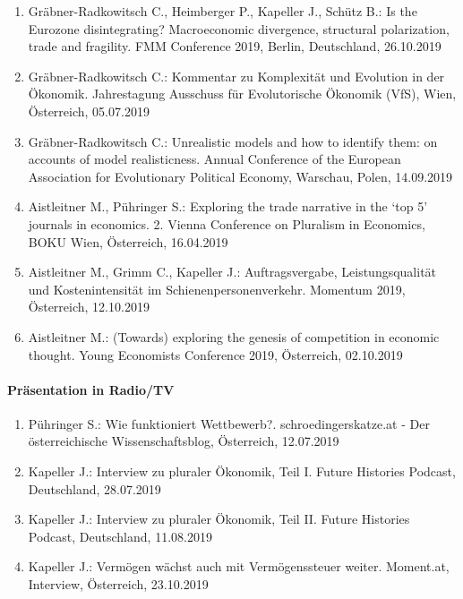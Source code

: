 \begin{enumerate}
	\item Gräbner-Radkowitsch C., Heimberger P., Kapeller J., Schütz B.: Is the Eurozone disintegrating? Macroeconomic divergence, structural polarization, trade and fragility. FMM Conference 2019, Berlin, Deutschland, 26.10.2019
	\item Gräbner-Radkowitsch C.: Kommentar zu Komplexität und Evolution in der Ökonomik. Jahrestagung Ausschuss für Evolutorische Ökonomik (VfS), Wien, Österreich, 05.07.2019
	\item Gräbner-Radkowitsch C.: Unrealistic models and how to identify them: on accounts of model realisticness. Annual Conference of the European Association for Evolutionary Political Economy, Warschau, Polen, 14.09.2019
	\item Aistleitner M., Pühringer S.: Exploring the trade narrative in the ‘top 5’ journals in economics. 2. Vienna Conference on Pluralism in Economics, BOKU Wien, Österreich, 16.04.2019
	\item Aistleitner M., Grimm C., Kapeller J.: Auftragsvergabe, Leistungsqualität und Kostenintensität im Schienenpersonenverkehr. Momentum 2019, Österreich, 12.10.2019
	\item Aistleitner M.: (Towards) exploring the genesis of competition in economic thought. Young Economists Conference 2019, Österreich, 02.10.2019
\end{enumerate}
\paragraph{Präsentation in Radio/TV}
\begin{enumerate}
	\item Pühringer S.: Wie funktioniert Wettbewerb?. schroedingerskatze.at - Der österreichische Wissenschaftsblog, Österreich, 12.07.2019
	\item Kapeller J.: Interview zu pluraler Ökonomik, Teil I. Future Histories Podcast, Deutschland, 28.07.2019
	\item Kapeller J.: Interview zu pluraler Ökonomik, Teil II. Future Histories Podcast, Deutschland, 11.08.2019
	\item Kapeller J.: Vermögen wächst auch mit Vermögenssteuer weiter. Moment.at, Interview, Österreich, 23.10.2019
\end{enumerate}
